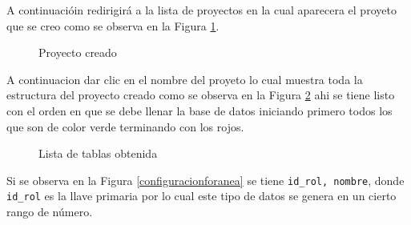 A continuaci\'oin  redirigir\'a a la lista de proyectos en la cual aparecera el proyeto que se creo como se observa en la Figura \ref{fig:viewprojectcreated}. 
\begin{figure}[H]
\caption{Proyecto creado} \label{fig:viewprojectcreated}
\centering
{}
\end{figure}
A continuacion dar clic en el nombre del proyeto lo cual muestra toda la estructura del proyecto creado como se observa en la Figura \ref{listaTablaObtenida} ahi se tiene listo con el orden en que se debe llenar la base de datos iniciando primero todos los que son de color verde terminando con los rojos.
\begin{figure}[H]
\caption{Lista de tablas obtenida}
\label{listaTablaObtenida}
\centering
{}
\end{figure}
Si se observa en la Figura \ref{configuracionforanea} se tiene \texttt{id\_rol, nombre}, donde \texttt{id\_rol} es la llave primaria por lo cual este tipo de datos se genera en un cierto rango de n\'umero.

